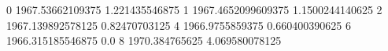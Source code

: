 0 1967.53662109375 1.221435546875
1 1967.4652099609375 1.1500244140625
2 1967.139892578125 0.82470703125
4 1966.9755859375 0.660400390625
6 1966.315185546875 0.0
8 1970.384765625 4.069580078125
